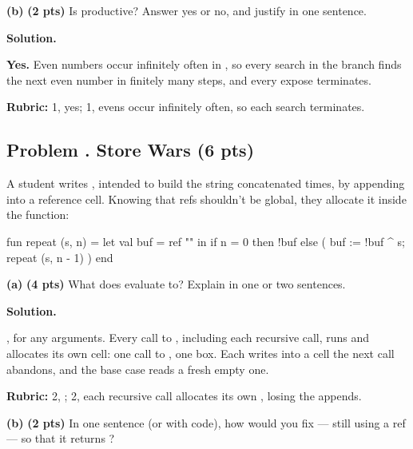 \documentclass[crop=false]{standalone}
\newif\ifsol
\newenvironment{solution}
    {\par\color{solution_color}\begin{framed}\textbf{Solution.}\par}
    {\end{framed}}
\newcommand{\quizproblem}[3]{%
  \needspace{5\baselineskip}%
  \stepcounter{problem}%
  \ifsol
    \subsection*{Problem \arabic{problem}. #1 \hfill \timing{#2} \quad (#3 pts)}%
  \else
    \subsection*{Problem \arabic{problem}. #1 \hfill (#3 pts)}%
  \fi
}
\newcommand{\subpts}[1]{\textbf{(#1 pts)}}
\newcommand{\answerspace}[1]{\ifsol\else\vspace{#1}\par\fi}
\begin{document}
\textbf{(b)} \subpts{2} Is 
productive? Answer yes or no, and justify in one sentence.

\answerspace{2.5cm}

\begin{solution}
\textbf{Yes.} Even numbers occur infinitely often in , so
every search in the  branch finds the next even number in
finitely many steps, and every expose terminates.

\textbf{Rubric:} 1, yes; 1, evens occur infinitely often, so each search
terminates.
\end{solution}

\newpage


\quizproblem{Store Wars}{6}{6}

A student writes , intended to build the string
 concatenated  times, by appending into a reference
cell. Knowing that refs shouldn't be global, they allocate it inside the
function:

\begin{codeblock}
  fun repeat (s, n) =
    let
      val buf = ref ""
    in
      if n = 0 then !buf
      else ( buf := !buf ^ s; repeat (s, n - 1) )
    end
\end{codeblock}

\textbf{(a)} \subpts{4} What does  evaluate to?
Explain in one or two sentences.

\answerspace{4cm}

\begin{solution}
\textbf{}, for any arguments. Every call to ,
including each recursive call, runs  and allocates its own
cell: one call to , one box. Each \code{:=} writes into a cell
the next call abandons, and the base case reads a fresh empty one.

\textbf{Rubric:} 2, ; 2, each recursive call allocates its own
, losing the appends.
\end{solution}

\textbf{(b)} \subpts{2} In one sentence (or with code), how would you fix
 --- still using a ref --- so that it returns
?
\end{document}
